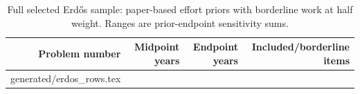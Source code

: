 \documentclass[11pt,letterpaper]{article}
\makeatletter
\let\inputrows\@@input
\makeatother
\begin{document}
\begin{table}[htbp]
\centering\small
\caption{Full selected Erd\H{o}s sample: paper-based effort priors with borderline work at half weight. Ranges are prior-endpoint sensitivity sums.}
\begin{tabular}{rrrr}\toprule
Problem number & Midpoint years & Endpoint years & Included/borderline items\\\midrule
\inputrows generated/erdos_rows.tex
\bottomrule\end{tabular}
\end{table}

\clearpage


\end{document}
